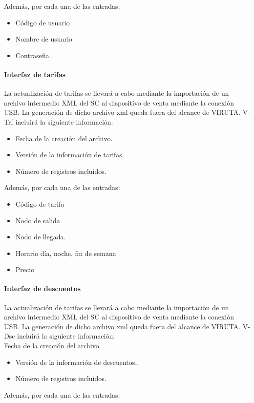 Además, por cada una de las entradas:

\begin{itemize}
\item Código de usuario
\item Nombre de usuario
\item Contraseña.
\end{itemize}

\paragraph{Interfaz de tarifas}
La actualización de tarifas se llevará a cabo mediante la importación de un archivo intermedio XML del SC al dispositivo de venta mediante la conexión USB. La generación de dicho archivo xml queda fuera del alcance de VIRUTA. V-Trf incluirá la siguiente información:

\begin{itemize}
\item Fecha de la creación del archivo.
\item Versión de la información de tarifas.
\item Número de registros incluidos.

\end{itemize}
Además, por cada una de las entradas:

\begin{itemize}
\item Código de tarifa
\item Nodo de salida
\item Nodo de llegada.
\item Horario {día, noche, fin de semana}
\item Precio
\end{itemize}

\paragraph{Interfaz de descuentos}

La actualización de tarifas se llevará a cabo mediante la importación de un archivo intermedio XML del SC al dispositivo de venta mediante la conexión USB. La generación de dicho archivo xml queda fuera del alcance de VIRUTA. V-Dsc incluirá la siguiente información:\\

Fecha de la creación del archivo.

\begin{itemize}
 \item Versión de la información de descuentos..
 \item  Número de registros incluidos.
\end{itemize}
Además, por cada una de las entradas:

